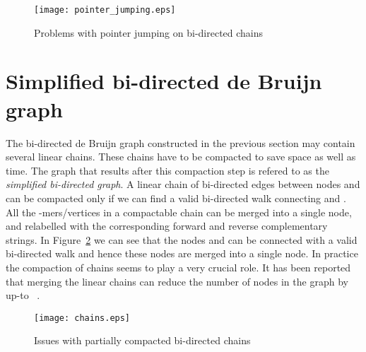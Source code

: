 \documentclass[11pt,conference,twocolumn]{IEEEtran}
\begin{document}
\begin{figure}
\begin{center}
\texttt{[image: pointer\_jumping.eps]}
\end{center}
\caption{Problems with pointer jumping on bi-directed chains}
\label{fig:bi-pointer}
\end{figure}

\section{Simplified bi-directed de Bruijn graph}
\label{sec:simplification}
The bi-directed de Bruijn graph constructed in the previous section may contain several linear 
chains. These chains have to be compacted to save space as well as time. The graph that results
after this compaction step is refered to as
the {\em simplified bi-directed graph}. A linear chain of bi-directed edges between nodes 
 and  can be compacted only if we can find a valid bi-directed walk connecting  and . 
All the -mers/vertices in a compactable chain can be 
merged into a single node, and relabelled with the corresponding forward and reverse complementary strings. 
In Figure~\ref{fig:chains} we can see that the nodes  and  can be connected with a valid bi-directed 
walk and hence these nodes are merged into a single node. In practice the compaction of chains seems
to play a very crucial role. It has been reported that merging the linear chains can 
reduce the number of nodes in the graph by up-to ~\cite{velvet08}. 

\begin{figure}
\begin{center}
\texttt{[image: chains.eps]}
\end{center}
\caption{Issues with partially compacted bi-directed chains}
\label{fig:chains}
\end{figure}
\end{document}
